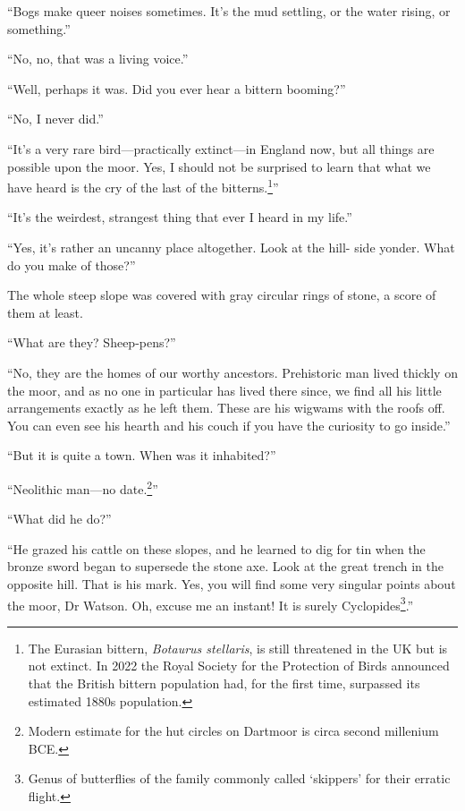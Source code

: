 \documentclass[paper=5.5in:8.5in,BCOR=7mm,twoside,DIV=calc,12pt,usegeometry,openany,chapterprefix,endperiod]{scrbook} %
\begin{document}
\enquote{Bogs make queer noises sometimes. It's the mud settling, or the water rising, or something.}

\enquote{No, no, that was a living voice.}

\enquote{Well, perhaps it was. Did you ever hear a bittern booming?}

\enquote{No, I never did.}

\enquote{It's a very rare bird\nobreakdash---practically extinct\nobreakdash---in England now, but all things are possible upon the moor. Yes, I should not be surprised to learn that what we have heard is the cry of the last of the bitterns.\footnote{The Eurasian bittern, \textit{Botaurus stellaris}, is still threatened in the UK but is not extinct. In 2022 the Royal Society for the Protection of Birds announced that the British bittern population had, for the first time, surpassed its estimated 1880s population.}}

\enquote{It's the weirdest, strangest thing that ever I heard in my life.}

\enquote{Yes, it's rather an uncanny place altogether. Look at the hill- side yonder. What do you make of those?}

The whole steep slope was covered with gray circular rings of stone, a score of them at least.

\enquote{What are they? Sheep-pens?}

\enquote{No, they are the homes of our worthy ancestors. Prehistoric man lived thickly on the moor, and as no one in particular has lived there since, we find all his little arrangements exactly as he left them. These are his wigwams with the roofs off. You can even see his hearth and his couch if you have the curiosity to go inside.}

\enquote{But it is quite a town. When was it inhabited?}

\enquote{Neolithic man\nobreakdash---no date.\footnote{Modern estimate for the hut circles on Dartmoor is circa second millenium BCE.}}

\enquote{What did he do?}

\enquote{He grazed his cattle on these slopes, and he learned to dig for tin when the bronze sword began to supersede the stone axe. Look at the great trench in the opposite hill. That is his mark. Yes, you will find some very singular points about the moor, Dr Watson. Oh, excuse me an instant! It is surely Cyclopides\footnote{Genus of butterflies of the family commonly called \enquote{skippers} for their erratic flight.}.}
\end{document}

